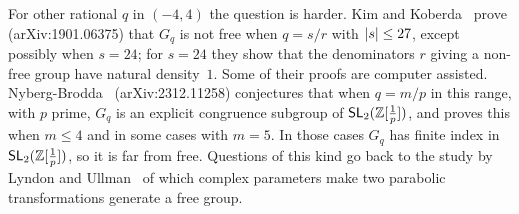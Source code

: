 For other rational $q$ in $(-4,4)$ the question is harder. Kim and
Koberda~\cite{kim-koberda-2019} prove (arXiv:1901.06375) that $G_q$ is not
free when $q = s/r$ with $\left|s\right| \le 27$, except possibly when $s = 24$; for
$s = 24$ they show that the denominators $r$ giving a non-free group have
natural density~$1$. Some of their proofs are computer assisted.
Nyberg-Brodda~\cite{nyberg-brodda-2023} (arXiv:2312.11258) conjectures that
when $q = m/p$ in this range, with $p$ prime, $G_q$ is an explicit congruence
subgroup of $\mathsf{SL}_2(\mathbb{Z}[\frac1p])$, and proves this when $m \le 4$ and in some cases with
$m = 5$. In those cases $G_q$ has finite index in $\mathsf{SL}_2(\mathbb{Z}[\frac1p])$, so it
is far from free. Questions of this kind go back to the study by Lyndon and
Ullman~\cite{lyndon-ullman-1969} of which complex parameters make two
parabolic transformations generate a free group.
